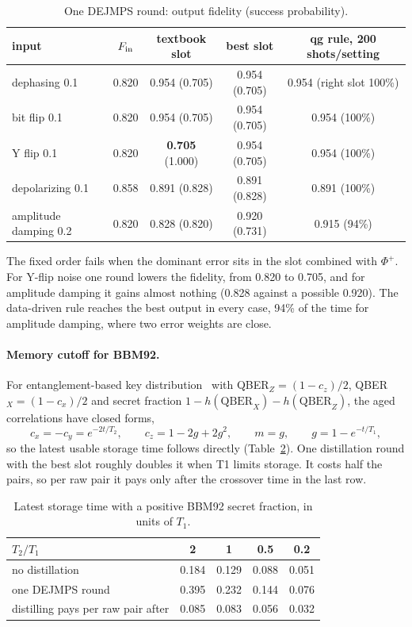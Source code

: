 \documentclass[11pt]{article}
\begin{document}
\begin{table}[t]
\centering\small
\caption{One DEJMPS round: output fidelity (success probability).}
\label{tab:dejmps}
\begin{tabular}{lcccc}
\toprule
input & $F_{\rm in}$ & textbook slot & best slot & qg rule, 200 shots/setting\\
\midrule
dephasing 0.1 & 0.820 & 0.954 (0.705) & 0.954 (0.705) & 0.954 (right slot 100\%)\\
bit flip 0.1 & 0.820 & 0.954 (0.705) & 0.954 (0.705) & 0.954 (100\%)\\
Y flip 0.1 & 0.820 & \textbf{0.705} (1.000) & 0.954 (0.705) & 0.954 (100\%)\\
depolarizing 0.1 & 0.858 & 0.891 (0.828) & 0.891 (0.828) & 0.891 (100\%)\\
amplitude damping 0.2 & 0.820 & 0.828 (0.820) & 0.920 (0.731) & 0.915 (94\%)\\
\bottomrule
\end{tabular}
\end{table}

The fixed order fails when the dominant error sits in the slot combined with $\Phi^+$. For Y-flip
noise one round lowers the fidelity, from 0.820 to 0.705, and for amplitude damping it gains almost
nothing (0.828 against a possible 0.920). The data-driven rule reaches the best output in every case,
94\% of the time for amplitude damping, where two error weights are close.

\paragraph{Memory cutoff for BBM92.} For entanglement-based key distribution~\cite{bbm92} with
QBER$_Z=(1-c_z)/2$, QBER$_X=(1-c_x)/2$ and secret fraction $1-h(\mathrm{QBER}_X)-h(\mathrm{QBER}_Z)$,
the aged correlations have closed forms,
\begin{equation}\label{eq:aged}
c_x=-c_y=e^{-2t/T_2},\qquad c_z=1-2g+2g^2,\qquad m=g,\qquad g=1-e^{-t/T_1},
\end{equation}
so the latest usable storage time follows directly (Table~\ref{tab:cutoff}). One distillation
round with the best slot roughly doubles it when T1 limits storage. It costs half the pairs, so per
raw pair it pays only after the crossover time in the last row.

\begin{table}[t]
\centering\small
\caption{Latest storage time with a positive BBM92 secret fraction, in units of $T_1$.}
\label{tab:cutoff}
\begin{tabular}{lcccc}
\toprule
$T_2/T_1$ & 2 & 1 & 0.5 & 0.2\\
\midrule
no distillation & 0.184 & 0.129 & 0.088 & 0.051\\
one DEJMPS round & 0.395 & 0.232 & 0.144 & 0.076\\
distilling pays per raw pair after & 0.085 & 0.083 & 0.056 & 0.032\\
\bottomrule
\end{tabular}
\end{table}
\end{document}
